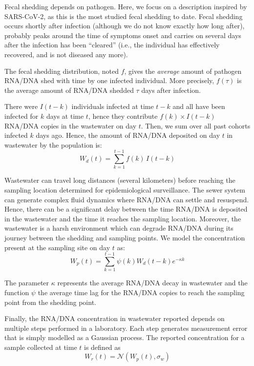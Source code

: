 \documentclass[11pt]{article} %
\begin{document}
Fecal shedding depends on pathogen. Here, we focus on a description inspired by SARS-CoV-2, as this is the most studied fecal shedding to date. 
Fecal shedding occurs shortly after infection (although we do not know exactly how long after), probably peaks around the time of symptoms onset and carries on several days after the infection has been ``cleared'' (i.e., the individual has effectively recovered, and is not diseased any more). 
 
The fecal shedding distribution, noted $f$, gives the \emph{average} amount of pathogen RNA/DNA shed with time by one infected individual. 
More precisely, $f(\tau)$ is the average amount of RNA/DNA shedded $\tau$ days after infection. 

There were $I(t-k)$ individuals infected at time $t-k$ and all have been infected for $k$ days at time $t$, hence they contribute $f(k) \times I(t-k)$ RNA/DNA copies in the wastewater on day $t$. Then, we sum over all past cohorts infected $k$ days ago. 
Hence, the amount of RNA/DNA deposited on day $t$ in wastewater by the population is:
\begin{equation}
W_d(t) = \sum_{k=1}^{t-1} f(k) \, I(t-k)
\end{equation}

Wastewater can travel long distances (several kilometers) before reaching the sampling location determined for epidemiological surveillance. The sewer system can generate complex fluid dynamics where RNA/DNA can settle and resuspend.
Hence, there can be a significant delay between the time RNA/DNA is deposited in the wastewater and the time it reaches the sampling location. 
Moreover, the wastewater is a harsh environment which can degrade RNA/DNA during its journey between the shedding and sampling points. 
We model the concentration present at the sampling site on day $t$ as:
\begin{equation}
W_p(t) = \sum_{k=1}^{t-1} \psi(k) W_d(t-k) e^{-\kappa k}
\end{equation}

The parameter $\kappa$ represents the average RNA/DNA decay in wastewater and the function $\psi$ the average time lag for the RNA/DNA copies to reach the sampling point from the shedding point.

Finally, the RNA/DNA concentration in wastewater reported depends on multiple steps performed in a laboratory. Each step generates measurement error that is simply modelled as a Gaussian process. 
The reported concentration for a sample collected at time $t$ is defined as
\begin{equation}
W_r(t) = \mathcal{N}(W_p(t), \sigma_w)
\end{equation}
\end{document}
